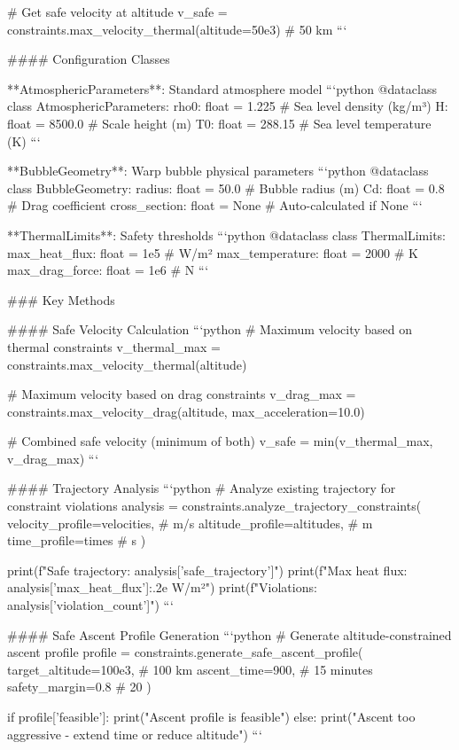 # Get safe velocity at altitude
v_safe = constraints.max_velocity_thermal(altitude=50e3)  # 50 km
```

#### Configuration Classes

**AtmosphericParameters**: Standard atmosphere model
```python
@dataclass
class AtmosphericParameters:
    rho0: float = 1.225        # Sea level density (kg/m³)
    H: float = 8500.0          # Scale height (m)
    T0: float = 288.15         # Sea level temperature (K)
```

**BubbleGeometry**: Warp bubble physical parameters
```python
@dataclass
class BubbleGeometry:
    radius: float = 50.0       # Bubble radius (m)
    Cd: float = 0.8           # Drag coefficient
    cross_section: float = None # Auto-calculated if None
```

**ThermalLimits**: Safety thresholds
```python
@dataclass
class ThermalLimits:
    max_heat_flux: float = 1e5     # W/m²
    max_temperature: float = 2000   # K
    max_drag_force: float = 1e6     # N
```

### Key Methods

#### Safe Velocity Calculation
```python
# Maximum velocity based on thermal constraints
v_thermal_max = constraints.max_velocity_thermal(altitude)

# Maximum velocity based on drag constraints  
v_drag_max = constraints.max_velocity_drag(altitude, max_acceleration=10.0)

# Combined safe velocity (minimum of both)
v_safe = min(v_thermal_max, v_drag_max)
```

#### Trajectory Analysis
```python
# Analyze existing trajectory for constraint violations
analysis = constraints.analyze_trajectory_constraints(
    velocity_profile=velocities,    # m/s
    altitude_profile=altitudes,     # m
    time_profile=times             # s
)

print(f"Safe trajectory: {analysis['safe_trajectory']}")
print(f"Max heat flux: {analysis['max_heat_flux']:.2e} W/m²")
print(f"Violations: {analysis['violation_count']}")
```

#### Safe Ascent Profile Generation
```python
# Generate altitude-constrained ascent profile
profile = constraints.generate_safe_ascent_profile(
    target_altitude=100e3,    # 100 km
    ascent_time=900,          # 15 minutes
    safety_margin=0.8         # 20%
)

if profile['feasible']:
    print("Ascent profile is feasible")
else:
    print("Ascent too aggressive - extend time or reduce altitude")
```

